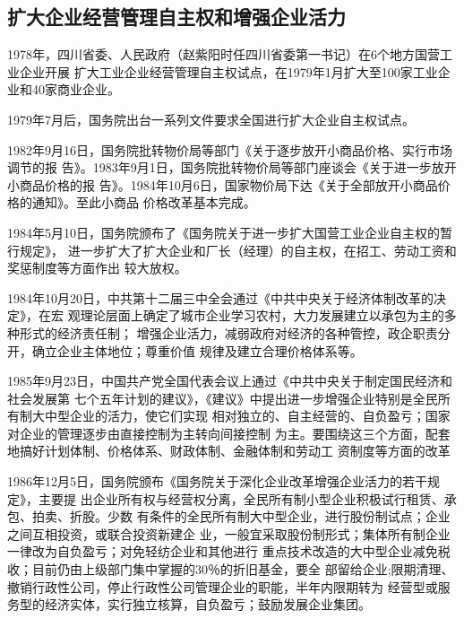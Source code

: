 

\subsection{扩大企业经营管理自主权和增强企业活力}

1978年，四川省委、人民政府（赵紫阳时任四川省委第一书记）在6个地方国营工业企业开展
扩大工业企业经营管理自主权试点，在1979年1月扩大至100家工业企业和40家商业企业。

1979年7月后，国务院出台一系列文件要求全国进行扩大企业自主权试点。

1982年9月16日，国务院批转物价局等部门《关于逐步放开小商品价格、实行市场调节的报
告》。1983年9月1日，国务院批转物价局等部门座谈会《关于进一步放开小商品价格的报
告》。1984年10月6日，国家物价局下达《关于全部放开小商品价格的通知》。至此小商品
价格改革基本完成。


1984年5月10日，国务院颁布了《国务院关于进一步扩大国营工业企业自主权的暂行规定》，
进一步扩大了扩大企业和厂长（经理）的自主权，在招工、劳动工资和奖惩制度等方面作出
较大放权。

1984年10月20日，中共第十二届三中全会通过《中共中央关于经济体制改革的决定》，在宏
观理论层面上确定了城市企业学习农村，大力发展建立以承包为主的多种形式的经济责任制；
增强企业活力，减弱政府对经济的各种管控，政企职责分开，确立企业主体地位；尊重价值
规律及建立合理价格体系等。

1985年9月23日，中国共产党全国代表会议上通过《中共中央关于制定国民经济和社会发展第
七个五年计划的建议》，《建议》中提出进一步增强企业特别是全民所有制大中型企业的活力，使它们实现
相对独立的、自主经营的、自负盈亏；国家对企业的管理逐步由直接控制为主转向间接控制
为主。要围绕这三个方面，配套地搞好计划体制、价格体系、财政体制、金融体制和劳动工
资制度等方面的改革

1986年12月5日，国务院颁布《国务院关于深化企业改革增强企业活力的若干规定》，主要提
出企业所有权与经营权分离，全民所有制小型企业积极试行租赁、承包、拍卖、折股。少数
有条件的全民所有制大中型企业，进行股份制试点；企业之间互相投资，或联合投资新建企
业，一般宜采取股份制形式；集体所有制企业一律改为自负盈亏；对免轻纺企业和其他进行
重点技术改造的大中型企业减免税收；目前仍由上级部门集中掌握的30％的折旧基金，要全
部留给企业;限期清理、撤销行政性公司，停止行政性公司管理企业的职能，半年内限期转为
经营型或服务型的经济实体，实行独立核算，自负盈亏；鼓励发展企业集团。

